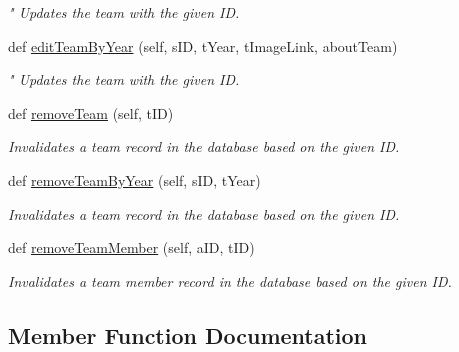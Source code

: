 \begin{DoxyCompactItemize}
\begin{DoxyCompactList}\small\item\em " Updates the team with the given ID. \end{DoxyCompactList}\item 
def \hyperlink{classhandler_1_1team_1_1_team_handler_a750abdf0f56213c05a322db464353956}{edit\+Team\+By\+Year} (self, s\+ID, t\+Year, t\+Image\+Link, about\+Team)
\begin{DoxyCompactList}\small\item\em " Updates the team with the given ID. \end{DoxyCompactList}\item 
def \hyperlink{classhandler_1_1team_1_1_team_handler_abc55ff5f4532a8486f8c941876dc84ce}{remove\+Team} (self, t\+ID)
\begin{DoxyCompactList}\small\item\em Invalidates a team record in the database based on the given ID. \end{DoxyCompactList}\item 
def \hyperlink{classhandler_1_1team_1_1_team_handler_a9edec7a490cd154b7d4033badb1fdacf}{remove\+Team\+By\+Year} (self, s\+ID, t\+Year)
\begin{DoxyCompactList}\small\item\em Invalidates a team record in the database based on the given ID. \end{DoxyCompactList}\item 
def \hyperlink{classhandler_1_1team_1_1_team_handler_aac0d812b5de7f390f36d12590429df95}{remove\+Team\+Member} (self, a\+ID, t\+ID)
\begin{DoxyCompactList}\small\item\em Invalidates a team member record in the database based on the given ID. \end{DoxyCompactList}\end{DoxyCompactItemize}


\subsection{Member Function Documentation}
\mbox{\label{classhandler_1_1team_1_1_team_handler_aed8995a60a6cdee0c5b59f2cab85e3af}} 
